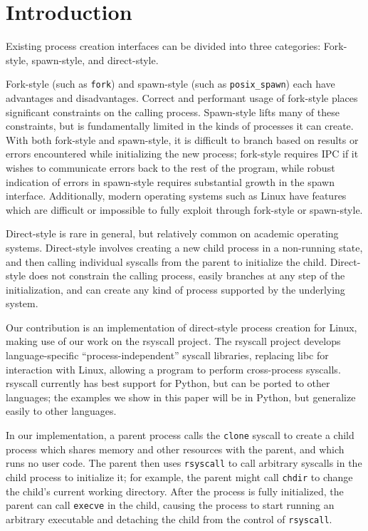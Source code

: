 \documentclass{acmart}
\begin{document}
\section{Introduction}\label{introduction}
Existing process creation interfaces can be divided into three categories:
Fork-style, spawn-style, and direct-style.

Fork-style (such as \texttt{fork}) and spawn-style (such as \texttt{posix\_spawn}) each have advantages and disadvantages.
Correct and performant usage of fork-style places significant constraints on the calling process.
Spawn-style lifts many of these constraints,
but is fundamentally limited in the kinds of processes it can create.
With both fork-style and spawn-style,
it is difficult to
branch based on results or errors encountered while initializing the new process;
fork-style requires IPC if it wishes to communicate errors back to the rest of the program,
while robust indication of errors in spawn-style requires substantial growth in the spawn interface.
Additionally, modern operating systems such as Linux have features
which are difficult or impossible to fully exploit through fork-style or spawn-style.

Direct-style is rare in general, but relatively common on academic operating systems.
Direct-style involves creating a new child process in a non-running state,
and then calling individual syscalls from the parent to initialize the child.
Direct-style does not constrain the calling process,
easily branches at any step of the initialization,
and can create any kind of process supported by the underlying system.

Our contribution is an implementation of direct-style process creation for Linux,
making use of our work on the rsyscall project.
The rsyscall project develops language-specific ``process-independent'' syscall libraries,
replacing libc for interaction with Linux,
allowing a program to perform cross-process syscalls.
rsyscall currently has best support for Python,
but can be ported to other languages;
the examples we show in this paper will be in Python,
but generalize easily to other languages.

In our implementation, a parent process calls the \texttt{clone} syscall
to create a child process which shares memory and other resources with the parent,
and which runs no user code.
The parent then uses \texttt{rsyscall}
to call arbitrary syscalls in the child process to initialize it;
for example, the parent might call \texttt{chdir} to change the child's current working directory.
After the process is fully initialized,
the parent can call \texttt{execve} in the child,
causing the process to start running an arbitrary executable
and detaching the child from the control of \texttt{rsyscall}.
\end{document}
